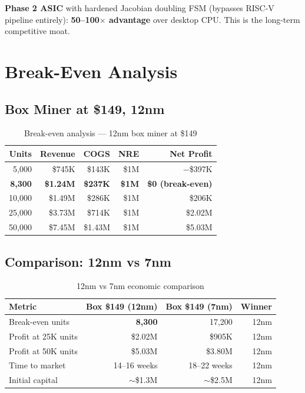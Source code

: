 \documentclass[11pt,a4paper]{article}
\begin{document}
\textbf{Phase 2 ASIC} with hardened Jacobian doubling FSM (bypasses RISC-V pipeline entirely): \textbf{50--100$\times$ advantage} over desktop CPU. This is the long-term competitive moat.

\section{Break-Even Analysis}

\subsection{Box Miner at \$149, 12nm}

\begin{table}[h]
\centering
\begin{tabular}{rrrrr}
\toprule
\textbf{Units} & \textbf{Revenue} & \textbf{COGS} & \textbf{NRE} & \textbf{Net Profit} \\
\midrule
5,000 & \$745K & \$143K & \$1M & $-$\$397K \\
\textbf{8,300} & \textbf{\$1.24M} & \textbf{\$237K} & \textbf{\$1M} & \textbf{\$0 (break-even)} \\
10,000 & \$1.49M & \$286K & \$1M & \$206K \\
25,000 & \$3.73M & \$714K & \$1M & \$2.02M \\
50,000 & \$7.45M & \$1.43M & \$1M & \$5.03M \\
\bottomrule
\end{tabular}
\caption{Break-even analysis --- 12nm box miner at \$149}
\end{table}

\subsection{Comparison: 12nm vs 7nm}

\begin{table}[h]
\centering
\begin{tabular}{lrrr}
\toprule
\textbf{Metric} & \textbf{Box \$149 (12nm)} & \textbf{Box \$149 (7nm)} & \textbf{Winner} \\
\midrule
Break-even units & \textbf{8,300} & 17,200 & 12nm \\
Profit at 25K units & \$2.02M & \$905K & 12nm \\
Profit at 50K units & \$5.03M & \$3.80M & 12nm \\
Time to market & 14--16 weeks & 18--22 weeks & 12nm \\
Initial capital & $\sim$\$1.3M & $\sim$\$2.5M & 12nm \\
\bottomrule
\end{tabular}
\caption{12nm vs 7nm economic comparison}
\end{table}
\end{document}
